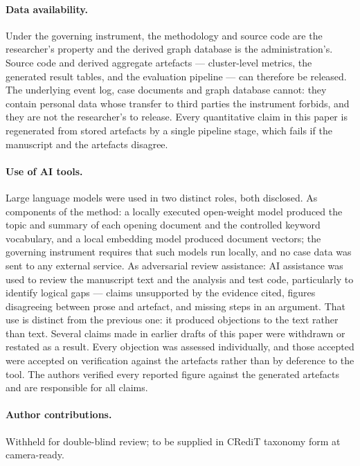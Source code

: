 \paragraph{Data availability.}
Under the governing instrument, the methodology and source code are the researcher's property
and the derived graph database is the administration's. Source code and derived aggregate
artefacts --- cluster-level metrics, the generated result tables, and the evaluation pipeline
--- can therefore be released. The underlying event log, case documents and graph database
cannot: they contain personal data whose transfer to third parties the instrument forbids, and
they are not the researcher's to release. Every quantitative claim in this paper is regenerated
from stored artefacts by a single pipeline stage, which fails if the manuscript and the
artefacts disagree.

\paragraph{Use of AI tools.}
Large language models were used in two distinct roles, both disclosed. As components of the
method: a locally executed open-weight model produced the topic and summary of each opening
document and the controlled keyword vocabulary, and a local embedding model produced document
vectors; the governing instrument requires that such models run locally, and no case data was
sent to any external service. As adversarial review assistance: AI assistance
was used to review the manuscript text and the analysis and test code, particularly to identify
logical gaps --- claims unsupported by the evidence cited, figures disagreeing between prose and
artefact, and missing steps in an argument. That use is distinct from the previous one: it
produced objections to the text rather than text. Several claims made in earlier drafts of this
paper were withdrawn or restated as a result. Every objection was assessed individually, and those accepted were accepted on verification against
the artefacts rather than by deference to the tool. The authors verified every reported figure
against the generated artefacts and are responsible for all claims.

\paragraph{Author contributions.}
Withheld for double-blind review; to be supplied in CRediT taxonomy form at camera-ready.
